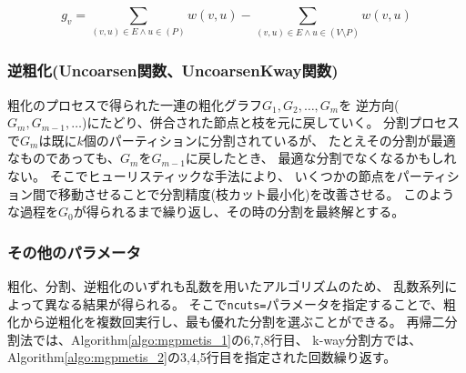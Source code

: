 {\footnotesize
\begin{equation}
g_v=\sum_{(v,u)\in E \wedge u\in(P)} w(v,u)  - \sum_{(v,u)\in E \wedge u\in (V\setminus P)} w(v,u)
\label{eq:gpmetis_gggp}
\end{equation}
}




\subsubsection{逆粗化(Uncoarsen関数、UncoarsenKway関数)}
粗化のプロセスで得られた一連の粗化グラフ$G_1,G_2,\dots,G_m$を
逆方向($G_m,G_{m-1},\dots$)にたどり、併合された節点と枝を元に戻していく。
分割プロセスで$G_m$は既に$k$個のパーティションに分割されているが、
たとえその分割が最適なものであっても、$G_m$を$G_{m-1}$に戻したとき、
最適な分割でなくなるかもしれない。
そこでヒューリスティックな手法により、
いくつかの節点をパーティション間で移動させることで分割精度(枝カット最小化)を改善させる。
このような過程を$G_0$が得られるまで繰り返し、その時の分割を最終解とする。



\subsubsection{その他のパラメータ}
粗化、分割、逆粗化のいずれも乱数を用いたアルゴリズムのため、
乱数系列によって異なる結果が得られる。
そこで\verb|ncuts=|パラメータを指定することで、粗化から逆粗化を複数回実行し、最も優れた分割を選ぶことができる。
再帰二分割法では、Algorithm\ref{algo:mgpmetis_1}の6,7,8行目、
k-way分割方では、Algorithm\ref{algo:mgpmetis_2}の3,4,5行目を指定された回数繰り返す。

